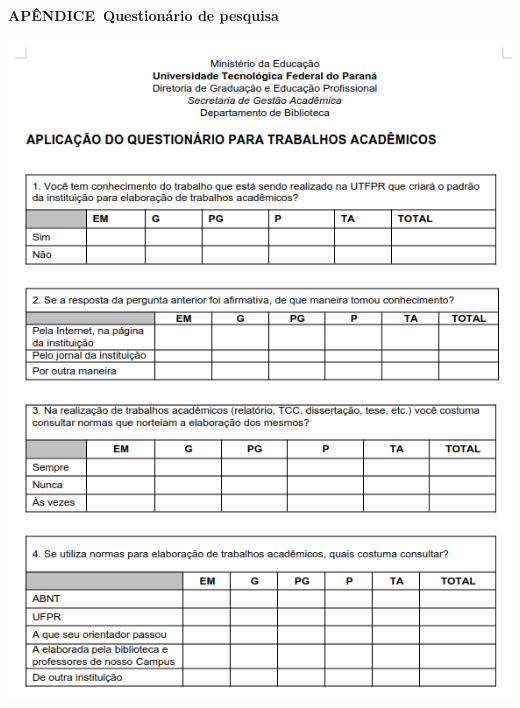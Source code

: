     \cleardoublepage
    \thispagestyle{empty}
    \vspace*{\fill}
    \begin{center}
        {\bfseries APÊNDICE~\thechapter{ -- }Questionário de pesquisa}
    \end{center}
    \vspace*{\fill}

\newpage
\centerline{\includegraphics[width=\textwidth]{./PosTexto/Ilustracoes/questionario}}%